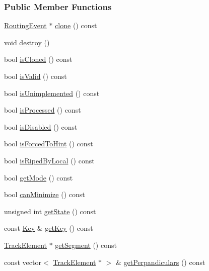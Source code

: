 \subsubsection*{Public Member Functions}
\begin{DoxyCompactItemize}
\item 
\hyperlink{classKite_1_1RoutingEvent}{Routing\-Event} $\ast$ \hyperlink{classKite_1_1RoutingEvent_af942901baf5713aced985265b4f2c478}{clone} () const 
\item 
void \hyperlink{classKite_1_1RoutingEvent_a3a80b6032f86a56bec74609034b3246f}{destroy} ()
\item 
bool \hyperlink{classKite_1_1RoutingEvent_ac98b3ddc1eb04076dc3539ecf107eaa2}{is\-Cloned} () const 
\item 
bool \hyperlink{classKite_1_1RoutingEvent_aac1b70a2ed67ead038c4d3f5ac4d8a81}{is\-Valid} () const 
\item 
bool \hyperlink{classKite_1_1RoutingEvent_a6e4a75ad6409b428a1710998c0793832}{is\-Unimplemented} () const 
\item 
bool \hyperlink{classKite_1_1RoutingEvent_afab9297dbf7887d82524362ab73d2ba7}{is\-Processed} () const 
\item 
bool \hyperlink{classKite_1_1RoutingEvent_aa70ca8c8d12fac70a98436e532c5ff79}{is\-Disabled} () const 
\item 
bool \hyperlink{classKite_1_1RoutingEvent_aa3ab3a65fb30053c42b64af5ff42b476}{is\-Forced\-To\-Hint} () const 
\item 
bool \hyperlink{classKite_1_1RoutingEvent_a8494e99c378a54e8e797200adbc4f7f9}{is\-Riped\-By\-Local} () const 
\item 
bool \hyperlink{classKite_1_1RoutingEvent_a06bda61b1c19277678cf2c3a57686aee}{get\-Mode} () const 
\item 
bool \hyperlink{classKite_1_1RoutingEvent_a0556022968c52a701fe1d3f21fde28ca}{can\-Minimize} () const 
\item 
unsigned int \hyperlink{classKite_1_1RoutingEvent_aeff84fdf6cc443a2c7a7bd33b03e871f}{get\-State} () const 
\item 
const \hyperlink{classKite_1_1RoutingEvent_1_1Key}{Key} \& \hyperlink{classKite_1_1RoutingEvent_ab17b3f4c7e2558bc29ea026925fd6fd6}{get\-Key} () const 
\item 
\hyperlink{classKite_1_1TrackElement}{Track\-Element} $\ast$ \hyperlink{classKite_1_1RoutingEvent_ad2d369e354ca1f9ff118851da69c7efc}{get\-Segment} () const 
\item 
const vector$<$ \hyperlink{classKite_1_1TrackElement}{Track\-Element} $\ast$ $>$ \& \hyperlink{classKite_1_1RoutingEvent_a8e3a42588bbadef86d3023edcabe3fd3}{get\-Perpandiculars} () const 

\end{DoxyCompactItemize}
